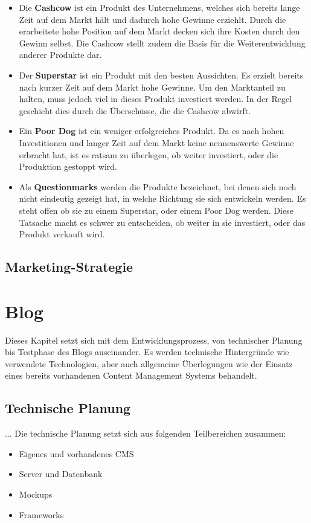   \begin{itemize}
    \item Die \textbf{Cashcow} ist ein Produkt des Unternehmens, welches sich bereits lange Zeit auf dem Markt hält und dadurch hohe Gewinne erziehlt. Durch die
    erarbeitete hohe Position auf dem Markt decken sich ihre Kosten durch den Gewinn selbst. Die Cashcow stellt zudem die Basis für die Weiterentwicklung anderer
    Produkte dar.

    \item Der \textbf{Superstar} ist ein Produkt mit den besten Aussichten. Es erzielt bereits nach kurzer Zeit auf dem Markt hohe Gewinne. Um den Marktanteil
    zu halten, muss jedoch viel in dieses Produkt investiert werden. In der Regel geschieht dies durch die Überschüsse, die die Cashcow abwirft.

    \item Ein \textbf{Poor Dog} ist ein weniger erfolgreiches Produkt. Da es nach hohen Investitionen und langer Zeit auf dem Markt keine nennenswerte
    Gewinne erbracht hat, ist es ratsam zu überlegen, ob weiter investiert, oder die Produktion gestoppt wird.

    \item Als \textbf{Questionmarks} werden die Produkte bezeichnet, bei denen sich noch nicht eindeutig gezeigt hat, in welche Richtung sie sich entwickeln werden.
    Es steht offen ob sie zu einem Superstar, oder einem Poor Dog werden. Diese Tatsache macht es schwer zu entscheiden, ob weiter in sie investiert, oder das Produkt
    verkauft wird.

  \end{itemize}
  \subsection{Marketing-Strategie}



\section{Blog}
Dieses Kapitel setzt sich mit dem Entwicklungsprozess, von technischer Planung bis Testphase
des Blogs auseinander. Es werden technische Hintergründe wie verwendete Technologien, aber
auch allgemeine Überlegungen wie der Einsatz eines bereits vorhandenen Content Management Systems
behandelt.

  \subsection{Technische Planung}
  ...
  Die technische Planung setzt sich aus folgenden Teilbereichen zusammen:
    \begin{itemize}
      \item Eigenes und vorhandenes CMS
      \item Server und Datenbank
      \item Mockups
      \item Frameworks
    \end{itemize}

